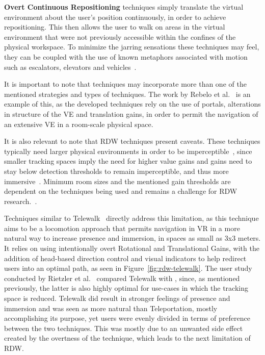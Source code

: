 \textbf{Overt Continuous Repositioning} techniques simply translate the virtual environment about the user's position continuously, in order 
to achieve repositioning. This then allows the user to walk on areas in the virtual environment that were not previously
accessible within the confines of the physical workspace. To minimize the jarring sensations these techniques may feel, they can be coupled 
with the use of known metaphors associated with motion such as escalators, elevators and vehicles~\cite{6180877}.

It is important to note that techniques may incorporate more than one of the mentioned strategies and types of techniques. The work by 
Rebelo et al.~\cite{Rebelo2024} is an example of this, as the developed techniques rely on the use of portals, alterations in
structure of the \gls{VE} and translation gains, in order to permit the navigation of an extensive \gls{VE} in a room-scale physical space.

It is also relevant to note that \gls{RDW} techniques present caveats. These techniques typically need larger physical environments in order to be 
imperceptible~\cite{Langbehn2018}, since smaller tracking spaces imply the need for higher value gains and gains need to stay below detection 
thresholds to remain imperceptible, and thus more immersive~\cite{Grechkin2016}. Minimum room sizes and the mentioned gain thresholds are dependent on 
the techniques being used and remains a challenge for \gls{RDW} research.~\cite{Cherni2020, 8255772}. 

Techniques similar to Telewalk~\cite{Rietzler2020} directly address this limitation, 
as this technique aims to be a locomotion approach that permits navigation in VR in a more natural way to increase presence and immersion, in 
spaces as small as 3x3 meters. It relies on using intentionally overt Rotational and Translational Gains, with the addition of head-based direction 
control and visual indicators to help redirect users into an optimal path, as seen in Figure~\ref{fig:rdw-telewalk}. The user study conducted 
by Rietzler et al.~\cite{Rietzler2020} compared Telewalk with , since, as mentioned previously, the latter is also highly 
optimal for use-cases in which the tracking space is reduced. Telewalk did result in stronger feelings of presence and immersion and was 
seen as more natural than Teleportation, mostly accomplishing its purpose, yet users were evenly divided in terms of preference between the two 
techniques. This was mostly due to an unwanted side effect created by the overtness of the technique, which leads to the next limitation of 
\gls{RDW}.

